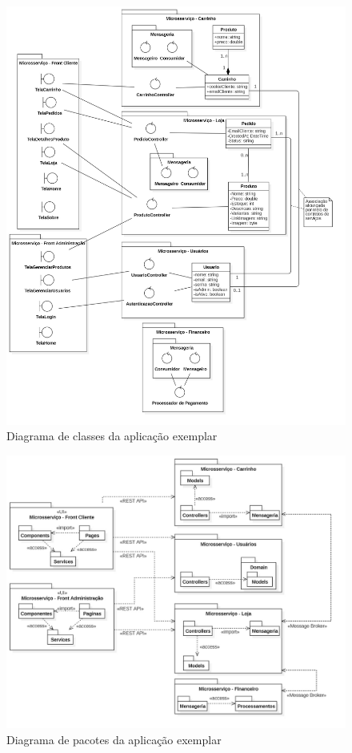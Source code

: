 \begin{figure}[htb]
	\caption{\label{figura-diagrama-de-classes}Diagrama de classes da aplicação exemplar}
	\begin{center}
	    \includegraphics[scale=0.25]{Diagramas/imagens/Classes.jpg}
	\end{center}
\end{figure}

\begin{figure}[htb]
	\caption{\label{figura-diagrama-de-pacotes}Diagrama de pacotes da aplicação exemplar}
	\begin{center}
	    \includegraphics[scale=0.27]{Diagramas/imagens/Pacotes.jpg}
	\end{center}
\end{figure}

